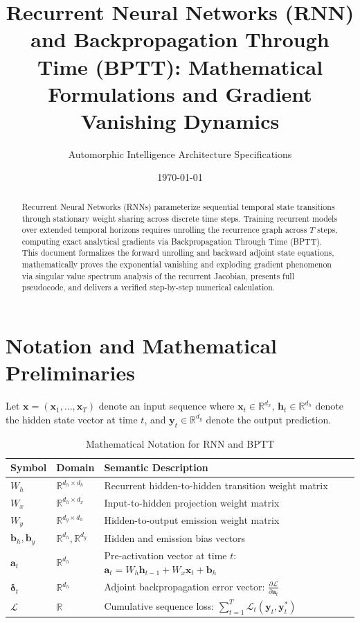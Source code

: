 \documentclass[11pt,a4paper]{article}
\title{Recurrent Neural Networks (RNN) and Backpropagation Through Time (BPTT): Mathematical Formulations and Gradient Vanishing Dynamics}
\author{Automorphic Intelligence Architecture Specifications}
\date{\today}
\theoremstyle{definition}
\begin{document}
\maketitle

\begin{abstract}
Recurrent Neural Networks (RNNs) parameterize sequential temporal state transitions through stationary weight sharing across discrete time steps. Training recurrent models over extended temporal horizons requires unrolling the recurrence graph across $T$ steps, computing exact analytical gradients via Backpropagation Through Time (BPTT). This document formalizes the forward unrolling and backward adjoint state equations, mathematically proves the exponential vanishing and exploding gradient phenomenon via singular value spectrum analysis of the recurrent Jacobian, presents full pseudocode, and delivers a verified step-by-step numerical calculation.
\end{abstract}

\section{Notation and Mathematical Preliminaries}

Let $\mathbf{x} = (\mathbf{x}_1, \dots, \mathbf{x}_T)$ denote an input sequence where $\mathbf{x}_t \in \mathbb{R}^{d_x}$, $\mathbf{h}_t \in \mathbb{R}^{d_h}$ denote the hidden state vector at time $t$, and $\mathbf{y}_t \in \mathbb{R}^{d_y}$ denote the output prediction.

\begin{table}[h]
\centering
\caption{Mathematical Notation for RNN and BPTT}
\begin{tabular}{lll}
\toprule
\textbf{Symbol} & \textbf{Domain} & \textbf{Semantic Description} \\
\midrule
$W_h$ & $\mathbb{R}^{d_h \times d_h}$ & Recurrent hidden-to-hidden transition weight matrix \\
$W_x$ & $\mathbb{R}^{d_h \times d_x}$ & Input-to-hidden projection weight matrix \\
$W_y$ & $\mathbb{R}^{d_y \times d_h}$ & Hidden-to-output emission weight matrix \\
$\mathbf{b}_h, \mathbf{b}_y$ & $\mathbb{R}^{d_h}, \mathbb{R}^{d_y}$ & Hidden and emission bias vectors \\
$\mathbf{a}_t$ & $\mathbb{R}^{d_h}$ & Pre-activation vector at time $t$: $\mathbf{a}_t = W_h \mathbf{h}_{t-1} + W_x \mathbf{x}_t + \mathbf{b}_h$ \\
$\boldsymbol{\delta}_t$ & $\mathbb{R}^{d_h}$ & Adjoint backpropagation error vector: $\frac{\partial \mathcal{L}}{\partial \mathbf{a}_t}$ \\
$\mathcal{L}$ & $\mathbb{R}$ & Cumulative sequence loss: $\sum_{t=1}^T \mathcal{L}_t(\mathbf{y}_t, \mathbf{y}_t^*)$ \\
\bottomrule
\end{tabular}
\end{table}
\end{document}
